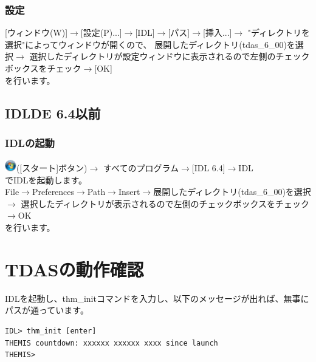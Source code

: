 \documentclass[a4j]{jbook}
\begin{document}
\subsubsection{設定}
[ウィンドウ(W)]$\rightarrow$[設定(P)...]$\rightarrow$[IDL]$\rightarrow$[パス]$\rightarrow$[挿入...]$\rightarrow$
"ディレクトリを選択"によってウィンドウが開くので、
展開したディレクトリ(tdas\_6\_00)を選択$\rightarrow$
選択したディレクトリが設定ウィンドウに表示されるので左側のチェックボックスをチェック$\rightarrow$[OK]\\
を行います。

\subsection{IDLDE 6.4以前}
\subsubsection{IDLの起動}
\includegraphics[width=0.5cm]{images/windows_start_button.eps}([スタート]ボタン)$\rightarrow$
すべてのプログラム$\rightarrow$[IDL 6.4]$\rightarrow$IDL\\
でIDLを起動します。\\
File$\rightarrow$Preferences$\rightarrow$Path$\rightarrow$Insert$\rightarrow$展開したディレクトリ(tdas\_6\_00)を選択$\rightarrow$
選択したディレクトリが表示されるので左側のチェックボックスをチェック$\rightarrow$OK\\
を行います。

\section{TDASの動作確認}
IDLを起動し、thm\_initコマンドを入力し、以下のメッセージが出れば、無事にパスが通っています。
\begin{screen}
\begin{verbatim}
IDL> thm_init [enter]
THEMIS countdown: xxxxxx xxxxxx xxxx since launch
THEMIS>  
\end{verbatim}
\end{screen}
\end{document}
